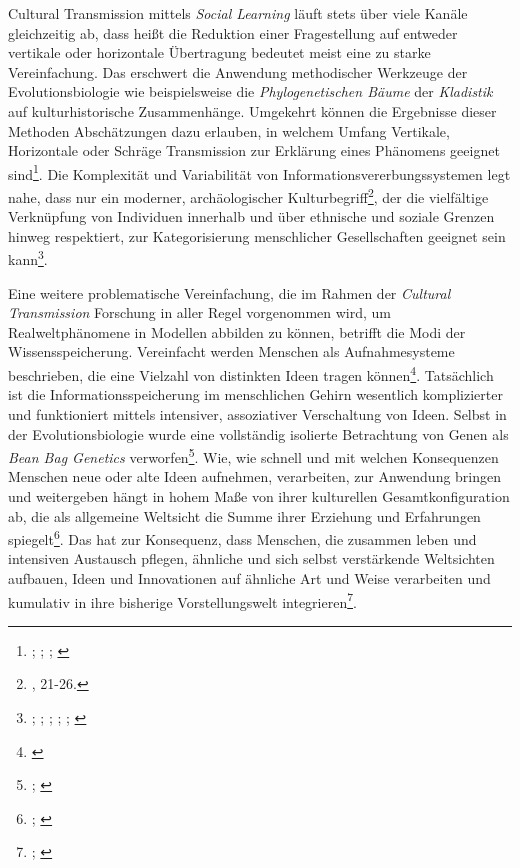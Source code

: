 \documentclass[openany,twoside,twocolumn]{book}
\let\rmarkdownfootnote\footnote%
\def\footnote{\protect\rmarkdownfootnote}
\begin{document}
Cultural Transmission mittels \emph{Social Learning} läuft stets über viele Kanäle gleichzeitig ab, dass heißt die Reduktion einer Fragestellung auf entweder vertikale oder horizontale Übertragung bedeutet meist eine zu starke Vereinfachung. Das erschwert die Anwendung methodischer Werkzeuge der Evolutionsbiologie wie beispielsweise die \emph{Phylogenetischen Bäume} der \emph{Kladistik} auf kulturhistorische Zusammenhänge. Umgekehrt können die Ergebnisse dieser Methoden Abschätzungen dazu erlauben, in welchem Umfang Vertikale, Horizontale oder Schräge Transmission zur Erklärung eines Phänomens geeignet sind\footnote{\textcite{jordan_cultural_2003}; \textcite{mcclure_cultural_2004}; \textcite{mcclure_gender_2007}; \textcite{tehrani_investigating_2002}}. Die Komplexität und Variabilität von Informationsvererbungssystemen legt nahe, dass nur ein moderner, archäologischer Kulturbegriff\footnote{\textcite{furholt_nordlichen_2009}, 21-26.}, der die vielfältige Verknüpfung von Individuen innerhalb und über ethnische und soziale Grenzen hinweg respektiert, zur Kategorisierung menschlicher Gesellschaften geeignet sein kann\footnote{\textcite{lipo_science_2001}; \textcite{lipo_population_1997}; \textcite{palmer_tools_2005}; \textcite{palmer_cultural_1995-1}; \textcite{palmer_categories_1997}; \textcite{mcelreath_shared_2003}}.

Eine weitere problematische Vereinfachung, die im Rahmen der \emph{Cultural Transmission} Forschung in aller Regel vorgenommen wird, um Realweltphänomene in Modellen abbilden zu können, betrifft die Modi der Wissensspeicherung. Vereinfacht werden Menschen als Aufnahmesysteme beschrieben, die eine Vielzahl von distinkten Ideen tragen können\footnote{\textcite{mithen_cognitive_1997}}. Tatsächlich ist die Informationsspeicherung im menschlichen Gehirn wesentlich komplizierter und funktioniert mittels intensiver, assoziativer Verschaltung von Ideen. Selbst in der Evolutionsbiologie wurde eine vollständig isolierte Betrachtung von Genen als \emph{Bean Bag Genetics} verworfen\footnote{\textcite{de_winter_beanbag_1997}; \textcite{mayr_where_1959}}. Wie, wie schnell und mit welchen Konsequenzen Menschen neue oder alte Ideen aufnehmen, verarbeiten, zur Anwendung bringen und weitergeben hängt in hohem Maße von ihrer kulturellen Gesamtkonfiguration ab, die als allgemeine Weltsicht die Summe ihrer Erziehung und Erfahrungen spiegelt\footnote{\textcite{gabora_ideas_2004}; \textcite{sperber_explaining_1996}}. Das hat zur Konsequenz, dass Menschen, die zusammen leben und intensiven Austausch pflegen, ähnliche und sich selbst verstärkende Weltsichten aufbauen, Ideen und Innovationen auf ähnliche Art und Weise verarbeiten und kumulativ in ihre bisherige Vorstellungswelt integrieren\footnote{\textcite{eerkens_cultural_2007}; \textcite{basalla_evolution_1988}}.
\end{document}
